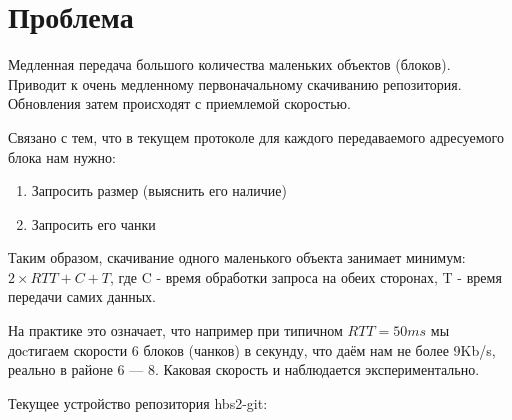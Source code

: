 \documentclass[11pt,a4paper]{article}
\begin{document}
\section{Проблема}

Медленная передача большого количества маленьких объектов (блоков).
Приводит к очень медленному первоначальному скачиванию репозитория.
Обновления затем происходят с приемлемой скоростью.

Связано с тем, что в текущем протоколе для каждого передаваемого адресуемого
блока нам нужно:

\begin{enumerate}
  \item Запросить размер (выяснить его наличие)
  \item Запросить его чанки
\end{enumerate}

Таким образом, скачивание одного маленького объекта занимает минимум:
\mbox{$ 2 \times RTT + C + T$}, где C - время обработки запроса на обеих
сторонах, T - время передачи самих данных.

На практике это означает, что например при типичном $ RTT = 50ms $ мы доcтигаем
скорости 6 блоков (чанков) в секунду, что даём нам не более 9Kb/s, реально в
районе 6 --- 8. Каковая скорость и наблюдается экспериментально.


Текущее устройство репозитория hbs2-git:

\begin{figure}[h!]
\centering
\end{figure}
\end{document}
